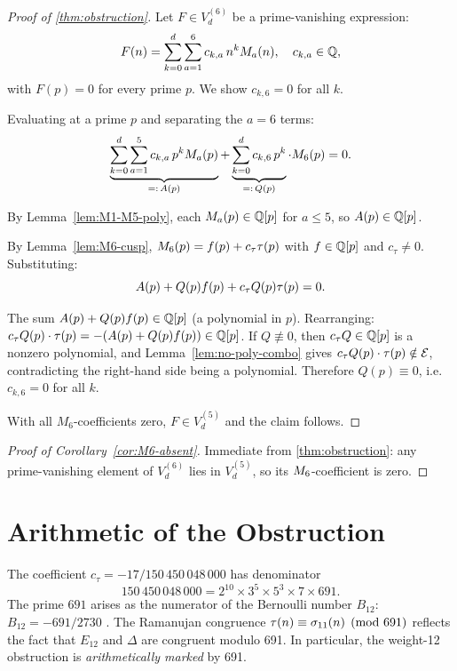 \documentclass[11pt]{article}
\begin{document}
\begin{proof}[Proof of \cref{thm:obstruction}]
Let $F\in V_d^{(6)}$ be a prime-vanishing expression:
\[
  F(n) = \sum_{k=0}^{d}\sum_{a=1}^{6} c_{k,a}\,n^kM_{a}(n),
  \quad c_{k,a}\in\mathbb{Q},
\]
with $F(p)=0$ for every prime $p$.
We show $c_{k,6}=0$ for all $k$.

Evaluating at a prime $p$ and separating the $a=6$ terms:
\[
  \underbrace{\sum_{k=0}^{d}\sum_{a=1}^{5} c_{k,a}\,p^kM_{a}(p)}_{=:\,A(p)}
  +
  \underbrace{\sum_{k=0}^{d} c_{k,6}\,p^k}_{=:\,Q(p)}
  \cdot M_{6}(p)
  = 0.
\]

By Lemma~\ref{lem:M1-M5-poly}, each $M_{a}(p)\in\mathbb{Q}[p]$ for $a\le 5$, so $A(p)\in\mathbb{Q}[p]$.

By Lemma~\ref{lem:M6-cusp}, $M_{6}(p)=f(p)+c_\tau\tau(p)$ with $f\in\mathbb{Q}[p]$ and
$c_\tau\ne 0$.
Substituting:
\[
  A(p) + Q(p)f(p) + c_\tau Q(p)\tau(p) = 0.
\]

The sum $A(p)+Q(p)f(p)\in\mathbb{Q}[p]$ (a polynomial in $p$).
Rearranging: $c_\tau Q(p)\cdot\tau(p) = -(A(p)+Q(p)f(p))\in\mathbb{Q}[p]$.
If $Q\not\equiv 0$, then $c_\tau Q\in\mathbb{Q}[p]$ is a nonzero polynomial, and
Lemma~\ref{lem:no-poly-combo} gives $c_\tau Q(p)\cdot\tau(p)\notin\mathcal{E}$, contradicting
the right-hand side being a polynomial.
Therefore $Q(p)\equiv 0$, i.e.\ $c_{k,6}=0$ for all $k$.

With all $M_6$-coefficients zero, $F\in V_d^{(5)}$ and the claim follows.
\end{proof}

\begin{proof}[Proof of Corollary~\ref{cor:M6-absent}]
Immediate from \cref{thm:obstruction}: any prime-vanishing element of $V_d^{(6)}$ lies in
$V_d^{(5)}$, so its $M_{6}$-coefficient is zero.
\end{proof}

\section{Arithmetic of the Obstruction}
\label{sec:arithmetic}

The coefficient $c_\tau = -17/150\,450\,048\,000$ has denominator
\[
  150\,450\,048\,000 = 2^{10}\times 3^5\times 5^3\times 7\times 691.
\]
The prime $691$ arises as the numerator of the Bernoulli number $B_{12}$:
$B_{12}=-691/2730$ \cite{Bernoulli}.
The Ramanujan congruence $\tau(n)\equiv\sigma_{11}(n)\pmod{691}$ reflects the fact that
$E_{12}$ and $\Delta$ are congruent modulo 691.
In particular, the weight-12 obstruction is \emph{arithmetically marked} by 691.
\end{document}
